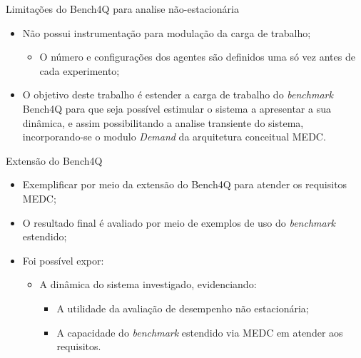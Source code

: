 \begin{frame}{Limitações do Bench4Q para analise não-estacionária}
	\begin{itemize}
		\item Não possui instrumentação para modulação da carga de trabalho;
		\begin{itemize}
			\item O número e configurações dos agentes são definidos uma  só vez antes de cada experimento;			 
		\end{itemize}
		\item O objetivo deste trabalho é estender a carga de trabalho do \textit{benchmark} Bench4Q para que seja possível estimular o sistema a apresentar a sua dinâmica, e assim possibilitando a analise transiente do sistema, incorporando-se o modulo \textit{Demand} da arquitetura conceitual MEDC.
	\end{itemize}
	
	
	
\end{frame}

\begin{frame}{Extensão do Bench4Q}
	\begin{itemize}
		\item Exemplificar por meio da extensão do Bench4Q para atender os requisitos MEDC;
		\item O resultado final é avaliado por meio de exemplos de uso do \textit{benchmark} estendido;
		\item Foi possível expor:
		\begin{itemize}
			\item A dinâmica do sistema investigado, evidenciando:
			\begin{itemize}
				\item A utilidade da avaliação de desempenho não estacionária;
				\item A capacidade do \textit{benchmark} estendido via MEDC em atender aos requisitos.
			\end{itemize} 
		\end{itemize} 
	\end{itemize}
\end{frame}


